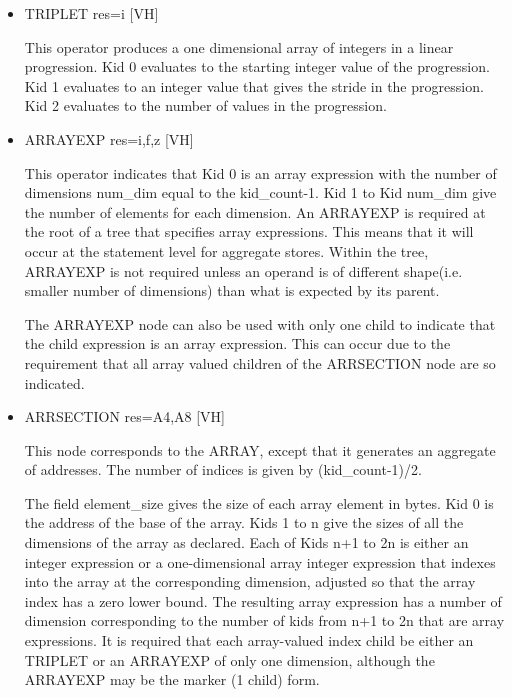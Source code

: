 \begin{itemize}
\item
{}%
TRIPLET res=i \hfill [VH]

This operator produces a one dimensional array of integers in a
linear progression. Kid 0 evaluates to the starting integer value
of the progression. Kid 1 evaluates to an integer value that gives
the stride in the progression. Kid 2 evaluates to the number of
values in the progression.

\item
{}%
ARRAYEXP res=i,f,z \hfill [VH]

This operator indicates that Kid 0 is an array expression with the
number of dimensions num\_dim equal to the kid\_count-1. Kid 1 to Kid
num\_dim give the number of elements for each dimension. An
%
ARRAYEXP is
required at the root of a tree that specifies array expressions.
This means that it will occur at the statement level for aggregate
stores. Within the tree,
%
ARRAYEXP is not required unless an operand is of different shape(i.e.
smaller number of dimensions) than what is expected by its parent.

The
%
ARRAYEXP node can also be used with only one child to indicate
that the child expression is an array expression. This can occur
due to the requirement that all array valued children of the
%
ARRSECTION node are so indicated.

\item
{}%
ARRSECTION res=A4,A8 \hfill [VH]

This node corresponds to the
%
ARRAY, except that it generates an
aggregate of addresses. The number of indices is given by
(kid\_count-1)/2.

The field element\_size gives the size of each array element in
bytes. Kid 0 is the address of the base of the array. Kids 1 to n
give the sizes of all the dimensions of the array as declared. Each
of Kids n+1 to 2n is either an integer expression or a one-dimensional
array integer expression that indexes into the array at the
corresponding dimension, adjusted so that the array index has a zero
lower bound. The resulting array expression has a number of dimension
corresponding to the number of kids from n+1 to 2n that are array
expressions. It is required that each array-valued index child be
either an
%
TRIPLET or an
%
ARRAYEXP of only one dimension, although
the
%
ARRAYEXP may be the marker (1 child) form.


\end{itemize}
